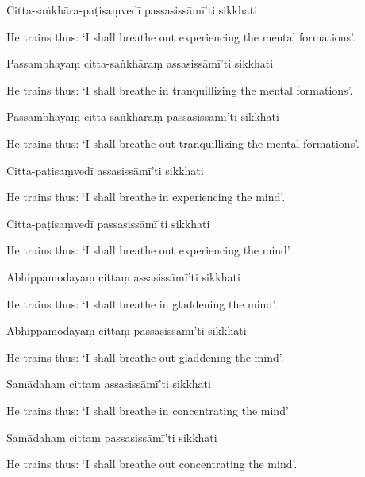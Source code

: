 Citta-saṅkhāra-paṭisaṃvedī passasissāmī'ti sikkhati

\begin{english}
  He trains thus: `I shall breathe out experiencing the mental formations'.
\end{english}

Passambhayaṃ citta-saṅkhāraṃ assasissāmī'ti sikkhati

\begin{english}
  He trains thus: `I shall breathe in tranquillizing the mental formations'.
\end{english}

Passambhayaṃ citta-saṅkhāraṃ passasissāmī'ti sikkhati

\begin{english}
  He trains thus: `I shall breathe out tranquillizing the mental formations'.
\end{english}

Citta-paṭisaṃvedī assasissāmī'ti sikkhati

\begin{english}
  He trains thus: `I shall breathe in experiencing the mind'.
\end{english}

Citta-paṭisaṃvedī passasissāmī'ti sikkhati

\begin{english}
  He trains thus: `I shall breathe out experiencing the mind'.
\end{english}

Abhippamodayaṃ cittaṃ assasissāmī'ti sikkhati

\begin{english}
  He trains thus: `I shall breathe in gladdening the mind'.
\end{english}

Abhippamodayaṃ cittaṃ passasissāmī'ti sikkhati

\begin{english}
  He trains thus: `I shall breathe out gladdening the mind'.
\end{english}

Samādahaṃ cittaṃ assasissāmī'ti sikkhati

\begin{english}
  He trains thus: `I shall breathe in concentrating the mind'
\end{english}

Samādahaṃ cittaṃ passasissāmī'ti sikkhati

\begin{english}
  He trains thus: `I shall breathe out concentrating the mind'.
\end{english}

